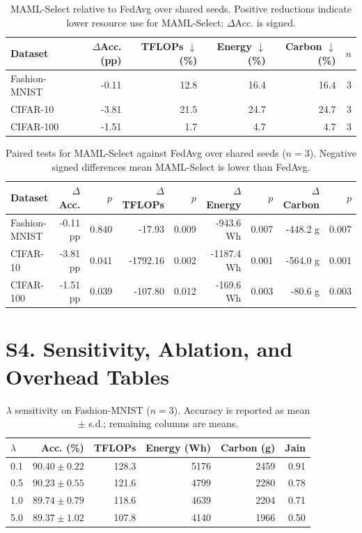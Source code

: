 \documentclass[10pt]{article}
\begin{document}
\begin{table}[!ht]
\centering
\caption{MAML-Select relative to FedAvg over shared seeds. Positive reductions indicate lower resource use for MAML-Select; $\Delta$Acc. is signed.}
\label{tab:supp_maml_vs_fedavg}
\small
\begin{tabular}{@{}lrrrrr@{}}
\toprule
Dataset & $\Delta$Acc. (pp) & TFLOPs $\downarrow$ (\%) & Energy $\downarrow$ (\%) & Carbon $\downarrow$ (\%) & $n$ \\
\midrule
Fashion-MNIST & -0.11 & 12.8 & 16.4 & 16.4 & 3 \\
CIFAR-10 & -3.81 & 21.5 & 24.7 & 24.7 & 3 \\
CIFAR-100 & -1.51 & 1.7 & 4.7 & 4.7 & 3 \\
\bottomrule
\end{tabular}
\end{table}

\begin{table}[!ht]
\centering
\caption{Paired tests for MAML-Select against FedAvg over shared seeds ($n=3$). Negative signed differences mean MAML-Select is lower than FedAvg.}
\label{tab:supp_paired_fedavg}
\small
\begin{tabular}{@{}lrrrrrrrr@{}}
\toprule
Dataset & $\Delta$Acc. & $p$ & $\Delta$TFLOPs & $p$ & $\Delta$Energy & $p$ & $\Delta$Carbon & $p$ \\
\midrule
Fashion-MNIST & -0.11 pp & 0.840 & -17.93 & 0.009 & -943.6 Wh & 0.007 & -448.2 g & 0.007 \\
CIFAR-10 & -3.81 pp & 0.041 & -1792.16 & 0.002 & -1187.4 Wh & 0.001 & -564.0 g & 0.001 \\
CIFAR-100 & -1.51 pp & 0.039 & -107.80 & 0.012 & -169.6 Wh & 0.003 & -80.6 g & 0.003 \\
\bottomrule
\end{tabular}
\end{table}

\section*{S4. Sensitivity, Ablation, and Overhead Tables}

\begin{table}[!ht]
\centering
\caption{$\lambda$ sensitivity on Fashion-MNIST ($n=3$). Accuracy is reported as mean $\pm$ s.d.; remaining columns are means.}
\label{tab:supp_lambda}
\small
\begin{tabular}{@{}lrrrrr@{}}
\toprule
$\lambda$ & Acc. (\%) & TFLOPs & Energy (Wh) & Carbon (g) & Jain \\
\midrule
0.1 & $90.40 \pm 0.22$ & 128.3 & 5176 & 2459 & 0.91 \\
0.5 & $90.23 \pm 0.55$ & 121.6 & 4799 & 2280 & 0.78 \\
1.0 & $89.74 \pm 0.79$ & 118.6 & 4639 & 2204 & 0.71 \\
5.0 & $89.37 \pm 1.02$ & 107.8 & 4140 & 1966 & 0.50 \\
\bottomrule
\end{tabular}
\end{table}
\end{document}
